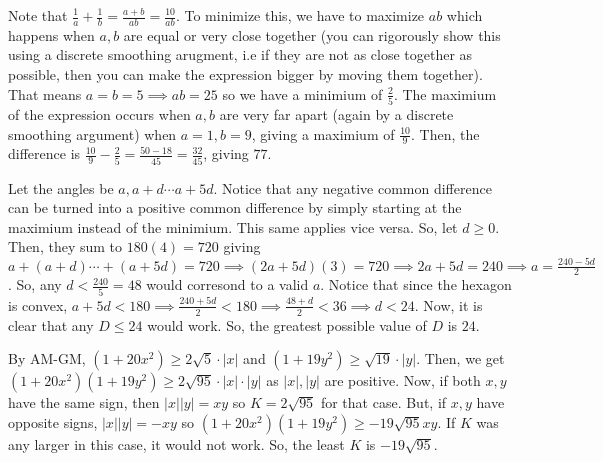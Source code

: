 \documentclass[11pt]{article}
\begin{document}
\begin{sol}
Note that $\frac{1}{a}+\frac{1}{b}=\frac{a+b}{ab}=\frac{10}{ab}$. To minimize this, we have to maximize $ab$ which happens when $a,b$ are equal or very close together (you can rigorously show this using a discrete smoothing arugment, i.e if they are not as close together as possible, then you can make the expression bigger by moving them together). That means $a=b=5\implies ab=25$ so we have a minimium of $\frac{2}{5}$. The maximium of the expression occurs when $a,b$ are very far apart (again by a discrete smoothing argument) when $a=1, b=9$, giving a maximium of $\frac{10}{9}$. Then, the difference is $\frac{10}{9}-\frac{2}{5}=\frac{50-18}{45}=\frac{32}{45}$, giving $\boxed{77}$.
\end{sol}


\begin{sol}
Let the angles be $a,a+d\cdots a+5d$.  Notice that any negative common difference can be turned into a positive common difference by simply starting at the maximium instead of the minimium. This same applies vice versa. So, let $d\ge 0$. Then, they sum to $180(4)=720$ giving $a+(a+d)\cdots + (a+5d)=720\implies (2a+5d)(3)=720\implies 2a+5d=240\implies a =\frac{240-5d}{2}$. So, any $d<\frac{240}{5}=48$ would corresond to a valid $a$. Notice that since the hexagon is convex, $a+5d<180\implies \frac{240+5d}{2} < 180 \implies \frac{48+d}{2} < 36\implies d < 24$. Now, it is clear that any $D\leq 24$ would work. So, the greatest possible value of $D$ is $\boxed{24}$.
\end{sol}


\begin{sol}
By AM-GM, $(1+20x^2)\ge 2\sqrt{5}\cdot |x|$ and $(1+19y^2)\ge \sqrt{19}\cdot |y|$. Then, we get $(1+20x^2)(1+19y^2)\ge 2\sqrt{95} \cdot |x|\cdot |y|$ as $|x|,|y|$ are positive. Now, if both $x,y$ have the same sign, then $|x||y|=xy$ so $K=2\sqrt{95}$ for that case. But, if $x,y$ have opposite signs, $|x||y|=-xy$ so $(1+20x^2)(1+19y^2)\ge -19\sqrt{95}xy$. If $K$ was any larger in this case, it would not work. So, the least $K$ is $\boxed{-19\sqrt{95}}$.
\end{sol}
\end{document}
